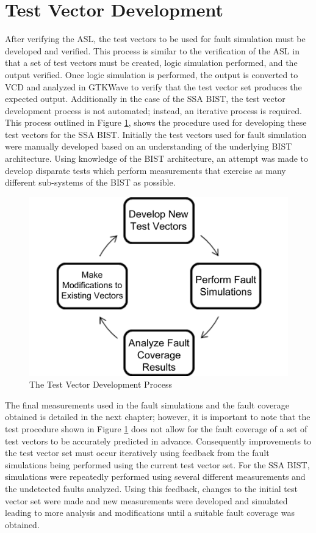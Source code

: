 \documentclass[12pt]{report}
\begin{document}
\section{Test Vector Development}
After verifying the ASL, the test vectors to be used for fault simulation must be developed and verified.  This process is similar to the verification of the ASL in that a set of test vectors must be created, logic simulation performed, and the output verified.  Once logic simulation is performed, the output is converted to VCD and analyzed in GTKWave to verify that the test vector set produces the expected output.  Additionally in the case of the SSA BIST, the test vector development process is not automated; instead, an iterative process is required. This process outlined in Figure \ref{fig:testdevproc}, shows the procedure used for developing these test vectors for the SSA BIST.  Initially the test vectors used for fault simulation were manually developed based on an understanding of the underlying BIST architecture. Using knowledge of the BIST architecture, an attempt was made to develop disparate tests which perform measurements that exercise as many different sub-systems of the BIST as possible. 
\begin{figure}
  \begin{center}
		\includegraphics[scale=.15]{images/process-flowchart}
  \end{center}
  \caption{The Test Vector Development Process}
  \label{fig:testdevproc}
\end{figure}
The final measurements used in the fault simulations and the fault coverage obtained is detailed in the next chapter; however, it is important to note that the test procedure shown in Figure \ref{fig:testdevproc} does not allow for the fault coverage of a set of test vectors to be accurately predicted in advance.  Consequently improvements to the test vector set must occur iteratively using feedback from the fault simulations being performed using the current test vector set.  For the SSA BIST, simulations were repeatedly performed using several different measurements and the undetected faults analyzed.  Using this feedback, changes to the initial test vector set were made and new measurements were developed and simulated leading to more analysis and modifications until a suitable fault coverage was obtained. 
\end{document}
